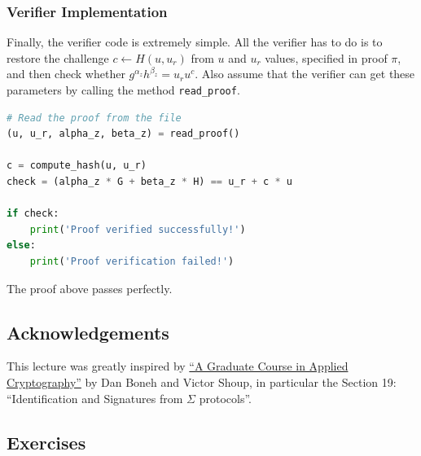 \documentclass[../lecture-notes-148x210.tex]{subfiles}
\begin{document}
\subsubsection{Verifier Implementation}

Finally, the verifier code is extremely simple. All the verifier has to do is to
restore the challenge $c \gets H(u,u_r)$ from $u$ and $u_r$ values, specified in
proof $\pi$, and then check whether $g^{\alpha_z}h^{\beta_z}=u_ru^c$. Also assume 
that the verifier can get these parameters by calling the method \texttt{read\_proof}.
\begin{lstlisting}[language=Python]
# Read the proof from the file
(u, u_r, alpha_z, beta_z) = read_proof()

c = compute_hash(u, u_r)
check = (alpha_z * G + beta_z * H) == u_r + c * u

if check:
    print('Proof verified successfully!')
else:
    print('Proof verification failed!')
\end{lstlisting}

The proof above passes perfectly.

\subsection*{Acknowledgements}

This lecture was greatly inspired by \href{https://toc.cryptobook.us/}{``A
Graduate Course in Applied Cryptography''} by Dan Boneh and Victor Shoup, in
particular the Section 19: ``Identification and Signatures from $\Sigma$
protocols''.

\subsection{Exercises}
\end{document}
